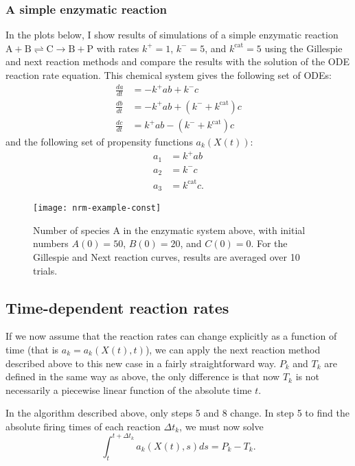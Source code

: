 \documentclass{article}
\begin{document}
\subsubsection{A simple enzymatic reaction}
\label{sec:simple-enzym-react}

In the plots below, I show results of simulations of a simple
enzymatic reaction
$\mathrm{A} + \mathrm{B} \rightleftharpoons \mathrm{C} \rightarrow
\mathrm{B} + \mathrm{P}$ with rates $k^+ = 1$, $k^- = 5$, and
$k^\text{cat} = 5$ using the Gillespie and next reaction methods and
compare the results with the solution of the ODE reaction rate
equation. This chemical system gives the following set of ODEs:
\begin{align}
\frac{da}{dt} &= -k^+ ab + k^- c \\
\frac{db}{dt} &= -k^+ ab + (k^- + k^\text{cat}) c \\
\frac{dc}{dt} &= k^+ ab - (k^- + k^\text{cat}) c
\end{align}
and the following set of propensity functions $a_k(X(t))$:
\begin{align}
a_1 &= k^+ ab \\
a_2 &= k^- c \\
a_3 &= k^\text{cat} c.
\end{align}

\begin{figure}
  \centering
  \texttt{[image: nrm-example-const]}
  \caption{Number of species A in the enzymatic system above, with
    initial numbers $A(0) = 50$, $B(0) = 20$, and $C(0) = 0$. For the
    Gillespie and Next reaction curves, results are averaged over 10
    trials.}
  \label{fig:nrm-example-const}
\end{figure}

\subsection{Time-dependent reaction rates}
\label{sec:time-depend-react}

If we now assume that the reaction rates can change explicitly as a
function of time (that is $a_k = a_k(X(t), t)$), we can apply the next
reaction method described above to this new case in a fairly
straightforward way. $P_k$ and $T_k$ are defined in the same way as
above, the only difference is that now $T_k$ is not necessarily a
piecewise linear function of the absolute time $t$.

In the algorithm described above, only steps 5 and 8 change. In step 5
to find the absolute firing times of each reaction $\Delta t_k$, we
must now solve
\begin{equation}
  \label{eq:step-5}
  \int_t^{t + \Delta t_k} a_k(X(t), s) ds = P_k - T_k.
\end{equation}
\end{document}
